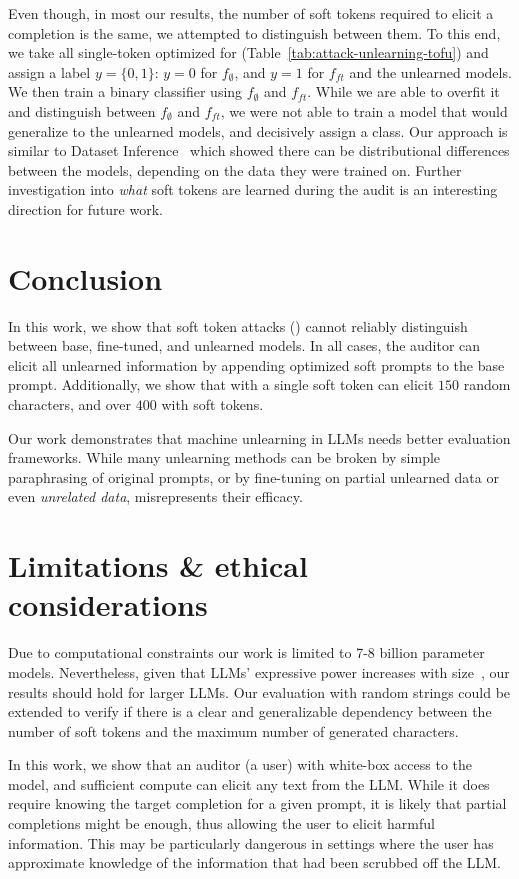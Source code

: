 Even though, in most our results, the number of soft tokens required to elicit a completion is the same,
we attempted to distinguish between them.
To this end, we take all single-token  optimized for \tofu (Table~\ref{tab:attack-unlearning-tofu}) and assign a label $y=\{0, 1\}$: $y=0$ for $f_\emptyset$, and $y=1$ for $f_{ft}$ and the unlearned models.
We then train a binary classifier using $f_\emptyset$ and $f_{ft}$.
While we are able to overfit it and distinguish between $f_\emptyset$ and $f_{ft}$,
we were not able to train a model that would generalize to the unlearned models, and decisively assign a class. 
Our approach is similar to Dataset Inference~\cite{maini2021di,maini2024dillms} which showed there can be distributional differences between the models, depending on the data they were trained on.
Further investigation into \emph{what} soft tokens are learned during the audit is an interesting direction for future work.

\section{Conclusion}\label{sec:conclusion}

In this work, we show that soft token attacks () cannot reliably distinguish between base, fine-tuned, and unlearned models.
In all cases, the auditor can elicit all unlearned information by appending optimized soft prompts to the base prompt.
Additionally, we show that \sta with a single soft token can elicit $150$ random characters, and over $400$ with soft tokens.

Our work demonstrates that machine unlearning in LLMs needs better evaluation frameworks.
While many unlearning methods can be broken by simple paraphrasing of original prompts, or by fine-tuning on partial unlearned data or even \emph{unrelated data}, 
\sta misrepresents their efficacy.

\section{Limitations \& ethical considerations}\label{sec:limitations}

Due to computational constraints our work is limited to 7-8 billion parameter models.
Nevertheless, given that LLMs' expressive power increases with size~\cite{kaplan2020scalinglaws}, our results should hold for larger LLMs.
Our evaluation with random strings could be extended to verify if there is a clear and generalizable dependency between the number of soft tokens and the maximum number of generated characters.

In this work, we show that an auditor (a user) with white-box access to the model, and sufficient compute can elicit any text from the LLM.
While it does require knowing the target completion for a given prompt, it is likely that partial completions might be enough, thus allowing the user to elicit harmful information.
This may be particularly dangerous in settings where the user has approximate knowledge of the information that had been scrubbed off the LLM.